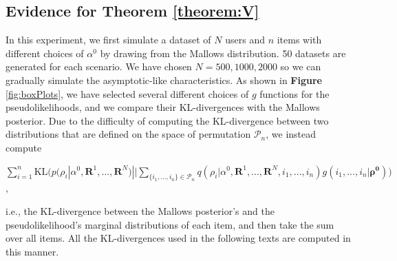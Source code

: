 \documentclass[11pt, oneside]{article}   	%
\begin{document}
\subsection{Evidence for Theorem \ref{theorem:V}}
In this experiment, we first simulate a dataset of $N$ users and $n$ items with different choices of $\alpha^0$ by drawing from the Mallows distribution.  50 datasets are generated for each scenario. We have chosen $N = 500, 1000,2000$ so we can gradually simulate the asymptotic-like characteristics. As shown in \textbf{Figure} \ref{fig:boxPlots}, we have selected several different choices of $g$ functions for the pseudolikelihoods, and we compare their KL-divergences with the Mallows posterior. {Due to the difficulty of computing the KL-divergence between two distributions that are defined on the space of permutation $\mathcal{P}_n$, we instead compute }
\begin{center}

 $\sum\limits_{i=1}^{n}\text{KL}\big( p(\rho_i|\alpha^0, \bm{R}^1,..., \bm{R}^N) || \sum\limits_{\{i_1, ..., i_n\}\in \mathcal{P}_n}q({{\rho}}_i|\alpha^0, \bm{R}^1, ..., \bm{R}^N, i_1, ..., i_n)g(i_1, ..., i_n|\bm{\rho^0})\big)$, \end{center}{i.e., the KL-divergence between the Mallows posterior's and the pseudolikelihood's marginal distributions of each item, and then take the sum over all items. All the KL-divergences used in the following texts are computed in this manner.} 
\end{document}
